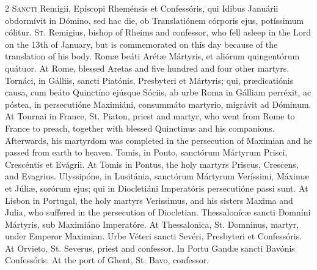 \begin{paracol}{2}
\lettrine[lines=2]{S}{ancti} Remígii, 
 Epíscopi Rheménsis et Confessóris, qui Idibus Januárii obdormívit in Dómino, 
 sed hac die, ob Translatiónem córporis ejus, potíssimum cólitur.
\switchcolumn
{}
\lettrine[lines=2]{S}{t.} Remigius, bishop of Rheims and 
 confessor, who fell asleep in the Lord on the 13th of January, but is 
 commemorated on this day because of the translation of his body.
\switchcolumn*
{}
Romæ beáti Arétæ 
 Mártyris, et aliórum quingentórum quátuor.
\switchcolumn
{}
At Rome, blessed Aretas and five 
 hundred and four other martyrs.
\switchcolumn*
{}
Tornáci, in Gálliis, 
 sancti Piatónis, Presbyteri et Mártyris; qui, prædicatiónis causa, cum beáto 
 Quinctíno ejúsque Sóciis, ab urbe Roma in Gálliam perréxit, ac póstea, in 
 persecutióne Maximiáni, consummáto martyrio, migrávit ad Dóminum.
\switchcolumn
{}
At Tournai in France, St. Piaton, 
 priest and martyr, who went from Rome to France to preach, together with 
 blessed Quinctinus and his companions. Afterwards, his martyrdom was 
 completed in the persecution of Maximian and he passed from earth to heaven.
\switchcolumn*
{}
Tomis, in Ponto, 
 sanctórum Mártyrum Prisci, Crescéntis et Evágrii.
\switchcolumn
{}
At Tomis in Pontus, the holy martyrs 
 Priscus, Crescens, and Evagrius.
\switchcolumn*
{}
Ulyssipóne, in 
 Lusitánia, sanctórum Mártyrum Veríssimi, Máximæ et Júliæ, sorórum ejus; qui 
 in Diocletiáni Imperatóris persecutióne passi sunt.
\switchcolumn
{}
At Lisbon in Portugal, the holy 
 martyrs Verissimus, and his sisters Maxima and Julia, who suffered in the 
 persecution of Diocletian.
\switchcolumn*
{}
Thessalonícæ sancti 
 Domníni Mártyris, sub Maximiáno Imperatóre.
\switchcolumn
{}
At Thessalonica, St. Domninus, 
 martyr, under Emperor Maximian.
\switchcolumn*
{}
Urbe Véteri sancti 
 Sevéri, Presbyteri et Confessóris.
\switchcolumn
{}
At Orvieto, St. Severus, priest and 
 confessor.
\switchcolumn*
{}
In Portu Gandæ sancti 
 Bavónis Confessóris.
\switchcolumn
{}
At the port of Ghent, St. Bavo, 
 confessor.
\switchcolumn*
{}
\end{paracol}


